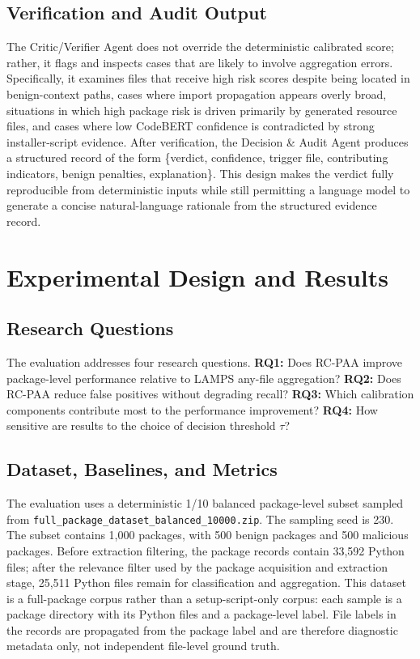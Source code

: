 \documentclass[conference,a4paper]{IEEEtran}
\newcommand{\rcpaa}{RC-PAA}
\newcommand{\codebert}{CodeBERT}
\begin{document}
\subsection{Verification and Audit Output}
The Critic/Verifier Agent does not override the deterministic calibrated score; rather,
it flags and inspects cases that are likely to involve aggregation errors. Specifically,
it examines files that receive high risk scores despite being located in benign-context
paths, cases where import propagation appears overly broad, situations in which high
package risk is driven primarily by generated resource files, and cases where low
\codebert{} confidence is contradicted by strong installer-script evidence. After
verification, the Decision \& Audit Agent produces a structured record of the form
\{verdict, confidence, trigger file, contributing indicators, benign penalties,
explanation\}. This design makes the verdict fully reproducible from deterministic
inputs while still permitting a language model to generate a concise natural-language
rationale from the structured evidence record.


\section{Experimental Design and Results}

\subsection{Research Questions}
The evaluation addresses four research questions. \textbf{RQ1:} Does \rcpaa{} improve
package-level performance relative to LAMPS any-file aggregation? \textbf{RQ2:} Does
\rcpaa{} reduce false positives without degrading recall? \textbf{RQ3:} Which
calibration components contribute most to the performance improvement?
\textbf{RQ4:} How sensitive are results to the choice of decision threshold $\tau$?

\subsection{Dataset, Baselines, and Metrics}
\label{sec:dataset}
The evaluation uses a deterministic 1/10 balanced package-level subset sampled from
\texttt{full\_package\_dataset\_balanced\_10000.zip}. The sampling seed is 230. The
subset contains 1,000 packages, with 500 benign packages and 500 malicious packages.
Before extraction filtering, the package records contain 33,592 Python files; after
the relevance filter used by the package acquisition and extraction stage, 25,511
Python files remain for classification and aggregation. This dataset is a full-package
corpus rather than a setup-script-only corpus: each sample is a package directory with
its Python files and a package-level label. File labels in the records are propagated
from the package label and are therefore diagnostic metadata only, not independent
file-level ground truth.
\end{document}
